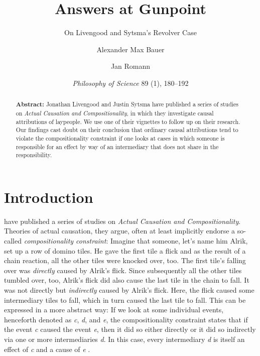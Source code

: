 \documentclass[12pt]{scrartcl}
\title{Answers at Gunpoint}
\subtitle{On Livengood and Sytsma's Revolver Case}
\author[1]{Alexander Max Bauer}
\author[2]{Jan Romann}
\affil[1]{ Department of Philosophy, University of Oldenburg,

Corresponding Author, E-Mail: \href{mailto:alexander.max.bauer@uni-oldenburg.de}{alexander.max.bauer@uni-oldenburg.de}}
\affil[2]{ SOCIUM Research Center on Inequality and Social Policy, University of Bremen}
\date{\small \textit{Philosophy of Science} 89 (1), 180–192}
\begin{document}
\maketitle

\begin{abstract}
   \noindent\textbf{\textsf{Abstract:}} Jonathan Livengood and Justin Sytsma have published a series of studies on \textit{Actual Causation and Compositionality}, in which they investigate causal attributions of laypeople. We use one of their vignettes to follow up on their research. Our findings cast doubt on their conclusion that ordinary causal attributions tend to violate the compositionality constraint if one looks at cases in which someone is responsible for an effect by way of an intermediary that does not share in the responsibility.
\end{abstract}

\section{Introduction}
\citet*{livengood_actual_2020} have published a series of studies on \textit{Actual Causation and Compositionality}. Theories of actual causation, they argue, often at least implicitly endorse a so-called \textit{compositionality constraint}: Imagine that someone, let's name him Alrik, set up a row of domino tiles. He gave the first tile a flick and as the result of a chain reaction, all the other tiles were knocked over, too. The first tile's falling over was \textit{directly} caused by Alrik's flick. Since subsequently all the other tiles tumbled over, too, Alrik's flick did also cause the last tile in the chain to fall. It was not directly but \textit{indirectly} caused by Alrik's flick. Here, the flick caused some intermediary tiles to fall, which in turn caused the last tile to fall. This can be expressed in a more abstract way: If we look at some individual events, henceforth denoted as \textit{c}, \textit{d}, and \textit{e}, the compositionality constraint states that if the event \textit{c} caused the event \textit{e}, then it did so either directly or it did so indirectly via one or more intermediaries \textit{d}. In this case, every intermediary \textit{d} is itself an effect of \textit{c} and a cause of \textit{e} \citep[44]{livengood_actual_2020}.
\end{document}
